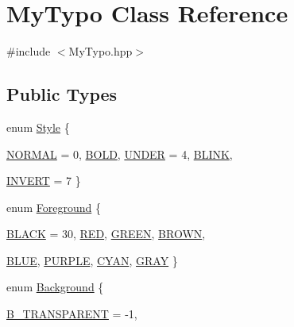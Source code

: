 \hypertarget{classMyTypo}{
\section{MyTypo Class Reference}
\label{classMyTypo}
}


{\ttfamily \#include $<$MyTypo.hpp$>$}

\subsection*{Public Types}
\begin{DoxyCompactItemize}
\item 
enum \hyperlink{classMyTypo_a8def2c649b389845fc9ef0425d6ba3f3}{Style} \{ \par
\hyperlink{classMyTypo_a8def2c649b389845fc9ef0425d6ba3f3a77b0bcc2d2ad397aaf217b9925311286}{NORMAL} =  0, 
\hyperlink{classMyTypo_a8def2c649b389845fc9ef0425d6ba3f3a7b77c3671053b7cecb4f5f62d5f3dacd}{BOLD}, 
\hyperlink{classMyTypo_a8def2c649b389845fc9ef0425d6ba3f3a092275401d9e91f117091f7f830c4537}{UNDER} =  4, 
\hyperlink{classMyTypo_a8def2c649b389845fc9ef0425d6ba3f3aeba436648705fd91802eca94dd774bef}{BLINK}, 
\par
\hyperlink{classMyTypo_a8def2c649b389845fc9ef0425d6ba3f3a072b22b51d23b6ba5507658851b1508a}{INVERT} =  7
 \}
\item 
enum \hyperlink{classMyTypo_a82023ae74e9c64ec7b6e57d54df708ea}{Foreground} \{ \par
\hyperlink{classMyTypo_a82023ae74e9c64ec7b6e57d54df708eaa5d485cc852fd8925db5f58724949ed7d}{BLACK} =  30, 
\hyperlink{classMyTypo_a82023ae74e9c64ec7b6e57d54df708eaae9a6714a38c1570a628c92d992b8886a}{RED}, 
\hyperlink{classMyTypo_a82023ae74e9c64ec7b6e57d54df708eaac0090bdb54450325945e1eec5f3240df}{GREEN}, 
\hyperlink{classMyTypo_a82023ae74e9c64ec7b6e57d54df708eaa3980d41699961553b6365178968e1235}{BROWN}, 
\par
\hyperlink{classMyTypo_a82023ae74e9c64ec7b6e57d54df708eaae3d9ddbcc3cceb11912943b7647b3842}{BLUE}, 
\hyperlink{classMyTypo_a82023ae74e9c64ec7b6e57d54df708eaa49a268a91b8ed1b28ea8518bed685029}{PURPLE}, 
\hyperlink{classMyTypo_a82023ae74e9c64ec7b6e57d54df708eaa20a754710244898038b406234e73682e}{CYAN}, 
\hyperlink{classMyTypo_a82023ae74e9c64ec7b6e57d54df708eaaa48d0f298f2b7be62cd7dc84d6b7a999}{GRAY}
 \}
\item 
enum \hyperlink{classMyTypo_ac6643b465e94f6ecb7fb650c4b3531e8}{Background} \{ \par
\hyperlink{classMyTypo_ac6643b465e94f6ecb7fb650c4b3531e8ab5db6d6b3a486ef6d773c3c04c1281b4}{B\_\-TRANSPARENT} =  -\/1, 

\end{DoxyCompactItemize}
